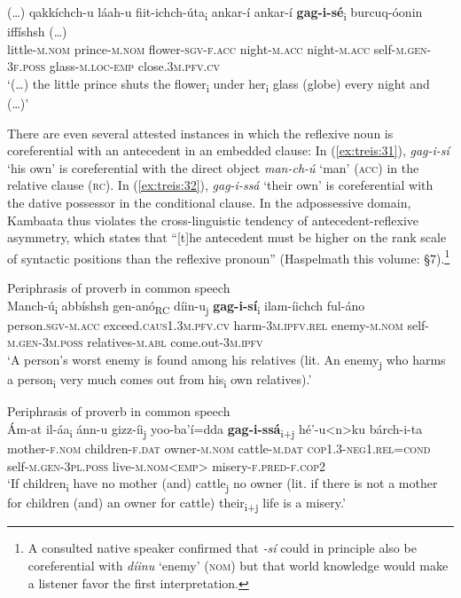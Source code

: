 \documentclass[output=paper]{langscibook}
\begin{document}
\ea\label{ex:treis:30}
\gll (…) qakkíchch-u láah-u fiit-ichch-úta\textup{\textsubscript{i}} ankar-í ankar-í \textbf{gag-i-sé}\textup{\textsubscript{i}} burcuq-óonin {iffíshsh (…)} \\
     {} little-\textsc{m.nom} prince-\textsc{m.nom} flower-\textsc{sgv-f.acc} night-\textsc{m.acc} night-\textsc{m.acc} self-\textsc{m.gen-3f.poss} glass-\textsc{m.loc-emp} close.3\textsc{m.pfv.cv}\\
\glt ‘(…) the little prince shuts the flower\textsubscript{i} under her\textsubscript{i} glass (globe) every night and (…)’ \citep[91]{Saint-Exupéry2018}\z

There are even several attested instances in which the reflexive noun is coreferential with an antecedent in an embedded clause: In (\ref{ex:treis:31}), \textit{gag-i-sí} ‘his own’ is coreferential with the direct object \textit{man-ch-ú} ‘man’ (\textsc{acc)} in the relative clause (\textsc{rc}). In (\ref{ex:treis:32}), \textit{gag-i-ssá} ‘their own’ is coreferential with the dative possessor in the conditional clause. In the adpossessive domain, Kambaata thus violates the cross-linguistic tendency of antecedent-reflexive asymmetry, which states that “[t]he antecedent must be higher on the rank scale of syntactic positions than the reflexive pronoun” (Haspelmath this volume: §7).\footnote{A consulted native speaker confirmed that \textit{-sí} could in principle also be coreferential with \textit{díinu} ‘enemy’ \textsc{(nom}) but that world knowledge would make a listener favor the first interpretation.}

\ea\label{ex:treis:31} Periphrasis of proverb in common speech \\
\gll {\ob}Manch-ú\textup{\textsubscript{i}} abbíshsh gen-anó{\cb}\textup{\textsubscript{RC}} díin-u\textup{\textsubscript{j}} \textbf{gag-i-sí}\textup{\textsubscript{i}} ilam-íichch ful-áno\\
     {\db}person.\textsc{sgv}-\textsc{m.acc} exceed.\textsc{caus1.3m.pfv.cv} harm-\textsc{3m.ipfv.rel} enemy-\textsc{m.nom} self-\textsc{m.gen-3m.poss} relatives-\textsc{m.abl} come.out-\textsc{3m.ipfv}\\
\glt ‘A person’s worst enemy is found among his relatives (lit. An enemy\textsubscript{j} who harms a person\textsubscript{i} very much comes out from his\textsubscript{i} own relatives).’ \citep[115]{AlamuAlamaayo2017}\z

\ea\label{ex:treis:32} Periphrasis of proverb in common speech\\
\gll {\ob}Ám-at il-áa\textup{\textsubscript{i}} ánn-u gizz-íi\textup{\textsubscript{j}} yoo-ba’í=dda{\cb} \textbf{gag-i-ssá}\textup{\textsubscript{i+j}} hé’-u<n>ku bárch-i-ta\\
    {\db}mother-\textsc{f.nom} children-\textsc{f.dat} owner-\textsc{m.nom} cattle-\textsc{m.dat} \textsc{cop1.3-neg1.rel=cond} self-\textsc{m.gen-3pl.poss} live-\textsc{m.nom<emp>} misery-\textsc{f.pred-f.cop2}\\
\glt ‘If children\textsubscript{i} have no mother (and) cattle\textsubscript{j} no owner (lit. if there is not a mother for children (and) an owner for cattle) their\textsubscript{i+j} life is a misery.’ \citep[10]{AlamuAlamaayo2017}\z
\end{document}
